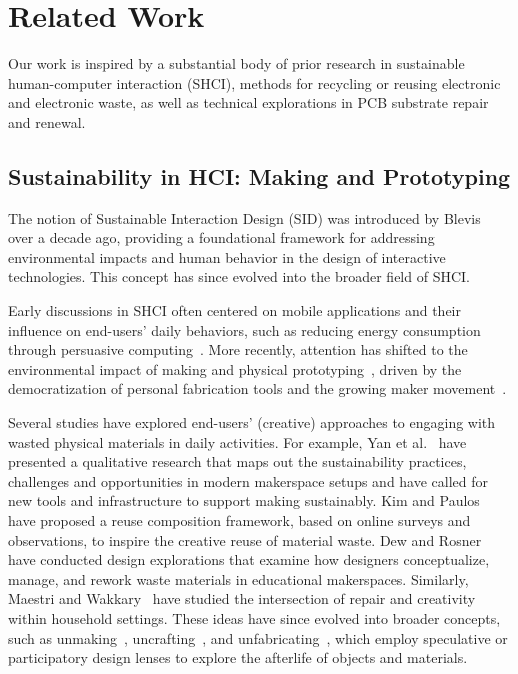 \section{Related Work}
Our work is inspired by a substantial body of prior research in sustainable human-computer interaction (SHCI), methods for recycling or reusing electronic and electronic waste, as well as technical explorations in PCB substrate repair and renewal.

\subsection{Sustainability in HCI: Making and Prototyping}

The notion of Sustainable Interaction Design (SID) was introduced by Blevis~\cite{10.1145/1240624.1240705} over a decade ago, providing a foundational framework for addressing environmental impacts and human behavior in the design of interactive technologies. 
This concept has since evolved into the broader field of SHCI.

Early discussions in SHCI often centered on mobile applications and their influence on end-users' daily behaviors, such as reducing energy consumption through persuasive computing~\cite{froehlich2009ubigreen, fogg2002persuasive}. 
More recently, attention has shifted to the environmental impact of making and physical prototyping~\cite{yan2023future, 10.1145/3613905.3636300}, driven by the democratization of personal fabrication tools and the growing maker movement~\cite{hudson2016understanding, shewbridge2014everyday}.

Several studies have explored end-users' (creative) approaches to engaging with wasted physical materials in daily activities. 
For example, Yan et al.~\cite{MakeMaking} have presented a qualitative research that maps out the sustainability practices, challenges and opportunities in modern makerspace setups and have called for new tools and infrastructure to support making sustainably. Kim and Paulos~\cite{10.1145/1978942.1979292} have proposed a reuse composition framework, based on online surveys and observations, to inspire the creative reuse of material waste. 
Dew and Rosner~\cite{10.1145/3322276.3322320} have conducted design explorations that examine how designers conceptualize, manage, and rework waste materials in educational makerspaces. 
Similarly, Maestri and Wakkary~\cite{maestri2011understanding} have studied the intersection of repair and creativity within household settings. 
These ideas have since evolved into broader concepts, such as unmaking~\cite{10.1145/3411764.3445529}, uncrafting~\cite{murer2015crafting}, and unfabricating~\cite{10.1145/3313831.3376227}, which employ speculative or participatory design lenses to explore the afterlife of objects and materials.


